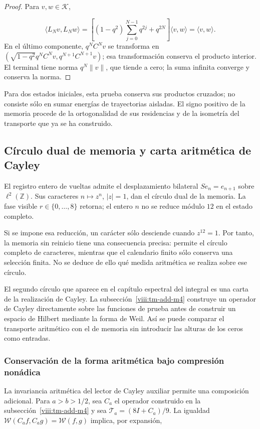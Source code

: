 \begin{proof}
Para \(v,w\in\mathcal K\),

\[
\langle L_Nv,L_Nw\rangle
=\left[(1-q^2)\sum_{j=0}^{N-1}q^{2j}+q^{2N}\right]
\langle v,w\rangle=\langle v,w\rangle.
\]
En el último componente, \(q^NC^Nv\) se transforma en \((\sqrt{1-q^2}q^NC^Nv,q^{N+1}C^{N+1}v)\); esa transformación conserva el producto interior. El terminal tiene norma \(q^N\|v\|\), que tiende a cero; la suma infinita converge y conserva la norma.
\end{proof}

Para dos estados iniciales, esta prueba conserva sus productos cruzados; no consiste sólo en sumar energías de trayectorias aisladas. El signo positivo de la memoria procede de la ortogonalidad de sus residencias y de la isometría del transporte que ya se ha construido.


\subsection{Círculo dual de memoria y carta aritmética de Cayley}
\label{viii:tm-add-c4}
El registro entero de vueltas admite el desplazamiento bilateral \(Se_n=e_{n+1}\) sobre \(\ell^2(\mathbb Z)\). Sus caracteres \(n\mapsto z^n\), \(|z|=1\), dan el círculo dual de la memoria. La fase visible \(r\in\{0,\ldots,8\}\) retorna; el entero \(n\) no se reduce módulo \(12\) en el estado completo.

Si se impone esa reducción, un carácter sólo desciende cuando \(z^{12}=1\). Por tanto, la memoria sin reinicio tiene una consecuencia precisa: permite el círculo completo de caracteres, mientras que el calendario finito sólo conserva una selección finita. No se deduce de ello qué medida aritmética se realiza sobre ese círculo.

El segundo círculo que aparece en el capítulo espectral del integral es una carta de la realización de Cayley. La subsección~\ref{viii:tm-add-m4} construye un operador de Cayley directamente sobre las funciones de prueba antes de construir un espacio de Hilbert mediante la forma de Weil. Así se puede comparar el transporte aritmético con el de memoria sin introducir las alturas de los ceros como entradas.


\subsubsection{Conservación de la forma aritmética bajo compresión nonádica}
\label{viii:tm-add-c4-1}
La invariancia aritmética del lector de Cayley auxiliar permite una composición adicional. Para \(a>b>1/2\), sea \(C_a\) el operador construido en la subsección~\ref{viii:tm-add-m4} y sea \(\mathcal T_a=(8I+C_a)/9\). La igualdad \(\mathscr W(C_af,C_ag)=\mathscr W(f,g)\) implica, por expansión,


